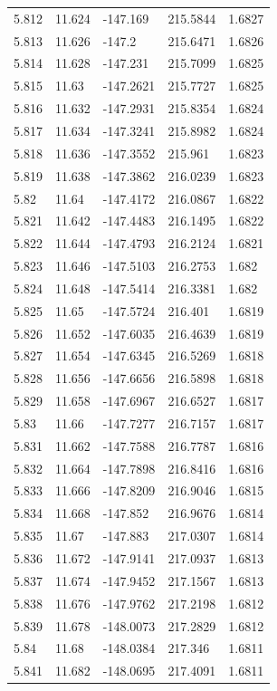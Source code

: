 \begin{tabular}{lllll}
5.812 & 11.624 & -147.169 & 215.5844 & 1.6827 \\
5.813 & 11.626 & -147.2 & 215.6471 & 1.6826 \\
5.814 & 11.628 & -147.231 & 215.7099 & 1.6825 \\
5.815 & 11.63 & -147.2621 & 215.7727 & 1.6825 \\
5.816 & 11.632 & -147.2931 & 215.8354 & 1.6824 \\
5.817 & 11.634 & -147.3241 & 215.8982 & 1.6824 \\
5.818 & 11.636 & -147.3552 & 215.961 & 1.6823 \\
5.819 & 11.638 & -147.3862 & 216.0239 & 1.6823 \\
5.82 & 11.64 & -147.4172 & 216.0867 & 1.6822 \\
5.821 & 11.642 & -147.4483 & 216.1495 & 1.6822 \\
5.822 & 11.644 & -147.4793 & 216.2124 & 1.6821 \\
5.823 & 11.646 & -147.5103 & 216.2753 & 1.682 \\
5.824 & 11.648 & -147.5414 & 216.3381 & 1.682 \\
5.825 & 11.65 & -147.5724 & 216.401 & 1.6819 \\
5.826 & 11.652 & -147.6035 & 216.4639 & 1.6819 \\
5.827 & 11.654 & -147.6345 & 216.5269 & 1.6818 \\
5.828 & 11.656 & -147.6656 & 216.5898 & 1.6818 \\
5.829 & 11.658 & -147.6967 & 216.6527 & 1.6817 \\
5.83 & 11.66 & -147.7277 & 216.7157 & 1.6817 \\
5.831 & 11.662 & -147.7588 & 216.7787 & 1.6816 \\
5.832 & 11.664 & -147.7898 & 216.8416 & 1.6816 \\
5.833 & 11.666 & -147.8209 & 216.9046 & 1.6815 \\
5.834 & 11.668 & -147.852 & 216.9676 & 1.6814 \\
5.835 & 11.67 & -147.883 & 217.0307 & 1.6814 \\
5.836 & 11.672 & -147.9141 & 217.0937 & 1.6813 \\
5.837 & 11.674 & -147.9452 & 217.1567 & 1.6813 \\
5.838 & 11.676 & -147.9762 & 217.2198 & 1.6812 \\
5.839 & 11.678 & -148.0073 & 217.2829 & 1.6812 \\
5.84 & 11.68 & -148.0384 & 217.346 & 1.6811 \\
5.841 & 11.682 & -148.0695 & 217.4091 & 1.6811 \\

\end{tabular}
